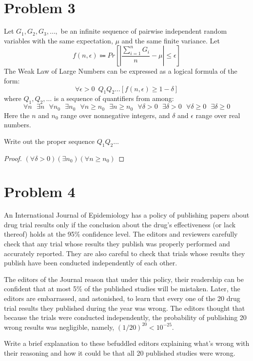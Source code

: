 \documentclass[14pt]{extarticle}
\begin{document}
\section{Problem 3}
Let $G_1, G_2, G_3, \ldots,$ be an infinite sequence of pairwise independent random variables with the same expectation, $\mu$ and the same finite variance. Let
$$
f(n, \epsilon) \Coloneqq Pr\left[\left|\frac{\sum_{i = 1}^n G_i}{n} - \mu\right| \leq \epsilon\right]
$$
The Weak Law of Large Numbers can be expressed as a logical formula of the form:
$$
\forall \epsilon > 0\,\,\, Q_1 Q_2 \ldots [f(n,\epsilon) \geq 1-\delta]
$$
where $Q_1, Q_2, \ldots$ is a sequence of quantifiers from among:
$$
\forall n \,\,\,\, \exists n \,\,\,\, \forall n_0 \,\,\,\, \exists n_0 \,\,\,\, \forall n \geq n_0 \,\,\,\, \exists n \geq n_0 \,\,\,\, \forall \delta > 0 \,\,\,\, \exists \delta > 0 \,\,\,\, \forall \delta \geq 0 \,\,\,\, \exists \delta \geq 0
$$
Here the $n$ and $n_0$ range over nonnegative integers, and $\delta$ and $\epsilon$ range over real numbers.

Write out the proper sequence $Q_1 Q_2 \ldots$

\begin{proof}
$(\forall \delta > 0)(\exists n_0)(\forall n \geq n_0)$
\end{proof}

\section{Problem 4}
An International Journal of Epidemiology has a policy of publishing papers about drug trial results only if the conclusion about the drug’s effectiveness (or lack thereof) holds at the 95\% confidence level. The editors and reviewers carefully check that any trial whose results they publish was properly performed and accurately reported. They are also careful to check that trials whose results they publish have been conducted independently of each other.

The editors of the Journal reason that under this policy, their readership can be confident that at most 5\% of the published studies will be mistaken. Later, the editors are embarrassed, and astonished, to learn that every one of the 20 drug trial results they published during the year was wrong. The editors thought that because the trials were conducted independently, the probability of publishing 20 wrong results was negligible, namely, $(1/20)^{20} < 10^{-25}$.

Write a brief explanation to these befuddled editors explaining what’s wrong with their reasoning and how it could be that all 20 published studies were wrong.
\end{document}
